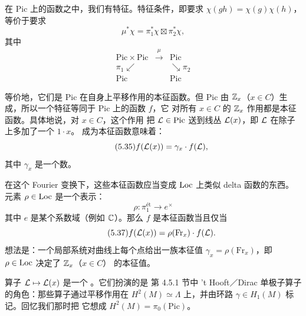 在 $\mathrm{Pic}$ 上的函数之中，我们有特征。特征条件，即要求
$\chi(gh)=\chi(g)\chi(h)$，等价于要求
\begin{equation}\tag{5.33}
\mu^{*}\chi=\pi_{1}^{*}\chi\boxtimes\pi_{2}^{*}\chi,
\end{equation}
其中
\begin{equation}\tag{5.34}
\begin{array}{ccc}
\mathrm{Pic}\times\mathrm{Pic} & \xrightarrow{\ \mu\ } & \mathrm{Pic}\\[2pt]
{\scriptstyle\pi_{1}}\swarrow & & \searrow{\scriptstyle\pi_{2}}\\[2pt]
\mathrm{Pic} & & \mathrm{Pic}
\end{array}
\end{equation}


等价地，它们是 $\mathrm{Pic}$ 在自身上平移作用的本征函数。但 $\mathrm{Pic}$ 由
$\mathbb{Z}_{x}$（$x\in C$）生成，所以一个特征等同于 $\mathrm{Pic}$ 上的函数 $f$，它
对所有 $x\in C$ 的 $\mathbb{Z}_{x}$ 作用都是本征函数。具体地说，对 $x\in C$，这个作用
把 $\mathcal{L}\in\mathrm{Pic}$ 送到线丛 $\mathcal{L}(x)$，即 $\mathcal{L}$ 在除子上多加了一个 $1\cdot x$。
成为本征函数意味着：
\begin{equation}\tag{5.35}
f(\mathcal{L}(x))=\gamma_{x}\cdot f(\mathcal{L}),
\end{equation}
其中 $\gamma_{x}$ 是一个数。

在这个 Fourier 变换下，这些本征函数应当变成 $\mathrm{Loc}$ 上类似 delta 函数的东西。
元素 $\rho\in\mathrm{Loc}$ 是一个表示：
\begin{equation}\tag{5.36}
\rho\colon\pi_{1}^{\text{ét}}\to e^{\times}
\end{equation}
其中 $e$ 是某个系数域（例如 $\mathbb{C}$）。那么 $f$ 是本征函数当且仅当
\begin{equation}\tag{5.37}
f(\mathcal{L}(x))=\rho(\mathrm{Fr}_{x})\cdot f(\mathcal{L}).
\end{equation}
想法是：一个局部系统对曲线上每个点给出一族本征值
$\gamma_{x}=\rho(\mathrm{Fr}_{x})$，即 $\rho\in\mathrm{Loc}$ 决定了 $\mathbb{Z}_{x}$（$x\in C$）
的本征值。

算子 $\mathcal{L}\mapsto\mathcal{L}(x)$ 是一个 。它们扮演的是
第 4.5.1 节中 't Hooft／Dirac 单极子算子的角色：那些算子通过平移作用在
$H^{2}(M)\simeq\Lambda$ 上，并由环路 $\gamma\in H_{1}(M)$ 标记。回忆我们那时把
它想成 $H^{2}(M)=\pi_{0}(\mathrm{Pic})$。

